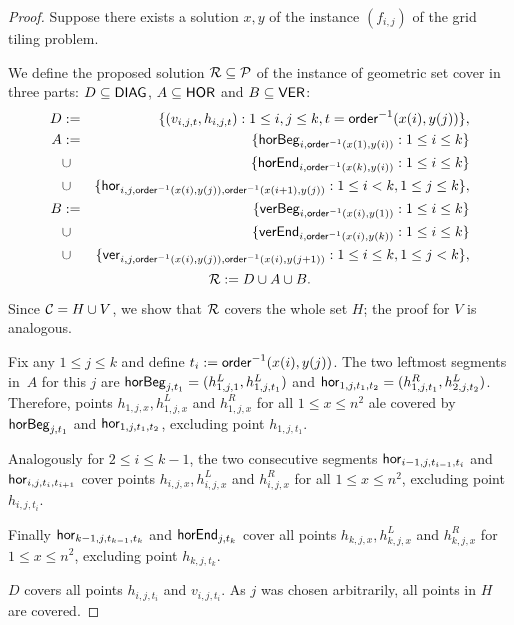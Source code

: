 \begin{proof}
Suppose there exists a solution $x,y$ of the instance $(f_{i,j})$
of the grid tiling problem.
	
We define the proposed solution $\mathcal{R} \subseteq \mathcal{P}$ of the instance
of geometric set cover
in three parts: $D \subseteq \mathsf{DIAG}$, $A \subseteq \mathsf{HOR}$ and $B \subseteq \mathsf{VER}$:
\begin{eqnarray*}
	D & := & \{(v_{i, j, t}, h_{i, j, t}) : 1 \le i, j \le k, t = \mathsf{order}^{-1}(x(i), y(j))\}, \\
	A & := & \{\mathsf{horBeg}_{i,\mathsf{order}^{-1}(x(1), y(i))} : 1 \le i \le k\} \\
	& \cup & \{\mathsf{horEnd}_{i,\mathsf{order}^{-1}(x(k), y(i))} : 1 \le i \le k\} \\
	& \cup & \{\mathsf{hor}_{i,j,\mathsf{order}^{-1}(x(i), y(j)),\mathsf{order}^{-1}(x(i+1), y(j))} : 1 \le i < k, 1 \le j \le k\}, \\
	B & := & \{\mathsf{verBeg}_{i,\mathsf{order}^{-1}(x(i), y(1))} : 1 \le i \le k\} \\
	& \cup & \{\mathsf{verEnd}_{i,\mathsf{order}^{-1}(x(i), y(k))} : 1 \le i \le k\} \\
	& \cup & \{\mathsf{ver}_{i,j,\mathsf{order}^{-1}(x(i), y(j)),\mathsf{order}^{-1}(x(i), y(j+1))} : 1 \le i \le k, 1 \le j < k\},
\end{eqnarray*}
	$$\mathcal{R} := D \cup A \cup B.$$

Since $\mathcal{C} = H \cup V$, we show that $\mathcal{R}$ covers the whole set $H$;
the proof for $V$ is analogous.

Fix any $1 \le j \le k$ and define $t_{i} := \mathsf{order}^{-1}(x(i), y(j))$.
The two leftmost segments in~$A$ for this $j$ are
$\mathsf{horBeg}_{j,t_1} = (h_{1,j,1}^L, h_{1, j, t_1}^L)$ and
$\mathsf{hor}_{1,j,t_1,t_2} = (h_{1,j, t_1}^R, h_{2,j,t_2}^L)$.
Therefore, points $h_{1,j,x}, h_{1,j,x}^L$ and $h_{1,j,x}^R$
for all $1 \le x \le n^2$ ale covered by $\mathsf{horBeg}_{j,t_1}$ and $\mathsf{hor}_{1,j,t_1,t_2}$,
excluding point $h_{1,j,t_1}$.

Analogously for $2 \le i \le k-1$,
the two consecutive segments $\mathsf{hor}_{i-1,j,t_{i-1},t_i}$
and $\mathsf{hor}_{i,j,t_i,t_{i+1}}$ cover points $h_{i,j,x}, h_{i,j,x}^L$ and $h_{i,j,x}^R$
for all $1 \le x \le n^2$,
excluding point $h_{i,j,t_i}$.

Finally $\mathsf{hor}_{k-1,j,t_{k-1},t_k}$ and $\mathsf{horEnd}_{j,t_k}$
cover all points $h_{k,j,x}, h_{k,j,x}^L$ and $h_{k,j,x}^R$
for ${1 \le x \le n^2}$, excluding point $h_{k,j,t_k}$.

$D$ covers all points $h_{i,j,t_i}$ and $v_{i,j,t_i}$.
As $j$ was chosen arbitrarily, all points in $H$ are covered.


\end{proof}
